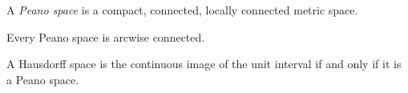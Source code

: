 \documentclass[12pt]{article}
\begin{document}
A {\it Peano space} is a compact, connected, locally connected metric space.

Every Peano space is arcwise connected. 

A Hausdorff space is the continuous image of the unit interval if and only if
it is a Peano space.

\end{document}
